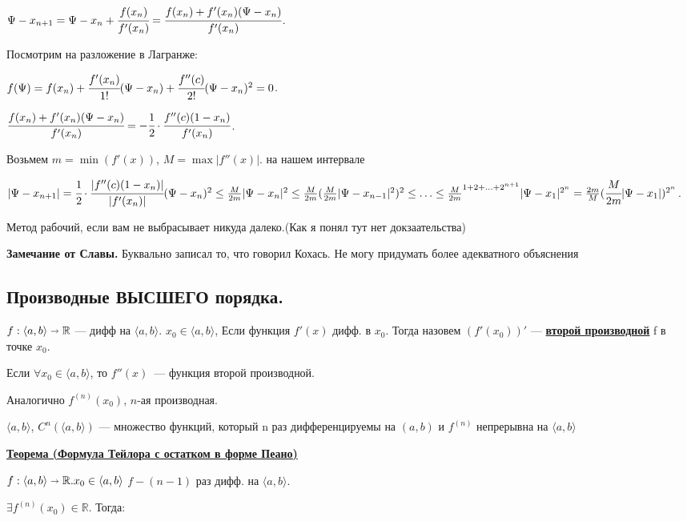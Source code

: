 \documentclass{article}
\newcommand{\deff}[1]{\underline{\textbf{#1}}}
\newcommand{\thmm}[1]{\underline{\textbf{#1}}}
\begin{document}
 $\Psi - x_{n+1} = \Psi-x_n + \cfrac{f(x_n)}{f'(x_n)} = \cfrac{f(x_n)  + f'(x_n) (\Psi-x_n)}{f'(x_n)}$.

 Посмотрим на разложение в Лагранже:
 
 $f(\Psi) = f(x_n) + \cfrac{f'(x_n)}{1!}(\Psi-x_n) + \cfrac{f''(c)}{2!}(\Psi-x_n)^2 = 0$.

$ \cfrac{f(x_n)  + f'(x_n) (\Psi-x_n)}{f'(x_n)} = -\cfrac{1}{2}\cdot \cfrac{f''(c)(1-x_n)}{f'(x_n)}$.

Возьмем $m = \min (f'(x))$, $M = \max |f''(x)| $. на нашем интервале

$|\Psi-x_{n+1}| = \cfrac{1}{2}\cdot \cfrac{|f''(c)(1-x_n)|}{|f'(x_n)|}(\Psi -x_n)^2\leq \frac{M}{2m}|\Psi - x_n|^2 \leq \frac{M}{2m}(\frac{M}{2m}|\Psi-{x_{n-1}}|^2)^2\leq \ldots \leq \frac{M}{2m}^{1+2+\ldots+2^{n+1}} |\Psi-x_1|^{2^n}= \frac{2m}{M}(\cfrac{M}{2m}|\Psi-x_1|)^{2^n}$.

Метод рабочий, если вам не выбрасывает никуда далеко.(Как я понял тут нет докзаательства)

\textbf{Замечание от Славы.} Буквально записал то, что говорил Кохась. Не могу придумать более адекватного объяснения

\pagebreak
\subsection{Производные ВЫСШЕГО порядка.}

$f:\langle a,b \rangle \shortrightarrow \mathbb{R}$ --- дифф на $\langle a,b \rangle$. $x_0 \in \langle a,b \rangle$,  Если функция $f'(x)$ дифф. в $x_0$. Тогда назовем $(f'(x_0))'$ --- \deff{второй производной} f в точке $x_0$.

Если $\forall x_0 \in \langle a,b\rangle$, то $f''(x)$~--- функция второй производной.

Аналогично $f^{(n)}(x_0)$, $n$-ая производная.

$\langle a,b\rangle$, $C^n (\langle a,b \rangle)$ --- множество функций, который n раз дифференцируемы на $(a,b)$ и $f^{(n)}$ непрерывна на $\langle a,b \rangle$


\thmm{Теорема (Формула Тейлора с остатком в форме Пеано)}

$f: \langle a,b \rangle \shortrightarrow \mathbb{R}. x_0 \in \langle a,b \rangle$ $f - (n-1)$ раз дифф. на $\langle a,b \rangle$.

$\exists f^{(n)}(x_0) \in \mathbb{R}.$ Тогда:
\end{document}
